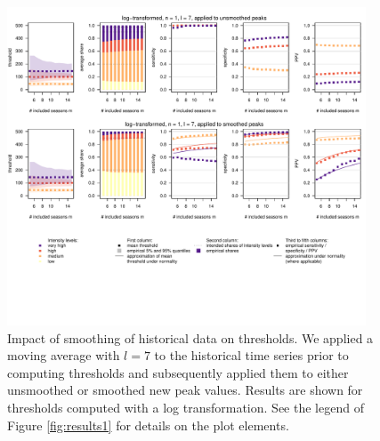 \documentclass{article}
\begin{document}
\begin{figure}[h!]
\includegraphics[width=0.95\textwidth]{figure/plot_smoothing7_fr_small.pdf}
\caption{Impact of smoothing of historical data on thresholds. We applied a moving average with $l = 7$ to the historical time series prior to computing thresholds and subsequently applied them to either unsmoothed or smoothed new peak values. Results are shown for thresholds computed with a log transformation. See the legend of Figure \ref{fig:results1} for details on the plot elements.}
\label{fig:results_smoothing7}
\end{figure}

\newpage
\end{document}
